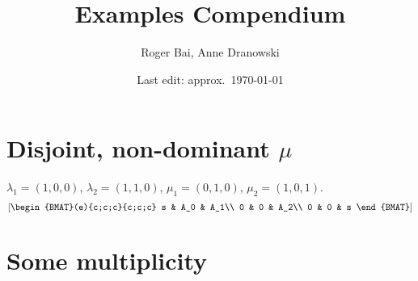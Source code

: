 \documentclass{article}
\title{Examples Compendium}
\author{Roger Bai, Anne Dranowski}
\date{Last edit: approx.\ \today}
\begin{document}
\maketitle

\section*{Disjoint, non-dominant $\mu$}

\begin{example}
$\lambda_1 = (1,0,0)$, $\lambda_2 = (1,1,0)$, $\mu_1 = (0,1,0)$, $\mu_2 = (1,0,1)$.  
\[
\left[\begin{BMAT}(e){c;c;c}{c;c;c} 
    s & A_0 & A_1\\
    0 & 0 & A_2\\
    0 & 0 & s
\end{BMAT}\right]    
\]
% 

\end{example}

\section*{Some multiplicity}
\end{document}
